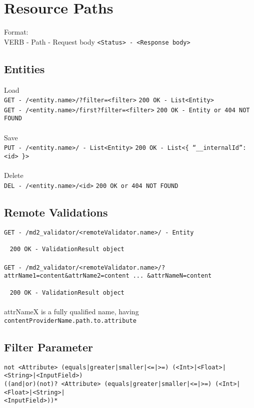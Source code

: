 
\section{Resource Paths}
Format: \\
VERB - Path - Request body \hfill \lstinline|<Status> - <Response body>|

\subsection*{Entities}

Load\\
\lstinline|GET - /<entity.name>/?filter=<filter>| \hfill \lstinline|200 OK - List<Entity>| \\
\lstinline|GET - /<entity.name>/first?filter=<filter>| \hfill \lstinline|200 OK - Entity or 404 NOT FOUND|
\\
\\
Save\\
\lstinline|PUT - /<entity.name>/ - List<Entity>| \hfill \lstinline|200 OK - List<{ “__internalId”: <id> }>|
\\
\\
Delete\\
\lstinline|DEL - /<entity.name>/<id>| \hfill \lstinline|200 OK or 404 NOT FOUND|


\subsection*{Remote Validations}
\lstinline|GET - /md2_validator/<remoteValidator.name>/ - Entity| 

~ \hfill \lstinline|200 OK - ValidationResult object|
\\ \\
\lstinline|GET - /md2_validator/<remoteValidator.name>/?attrName1=content&attrName2=content ... &attrNameN=content| 

~ \hfill \lstinline|200 OK - ValidationResult object|
\\
\\
attrNameX is a fully qualified name, having \\
\lstinline|contentProviderName.path.to.attribute|


\subsection*{Filter Parameter}
\lstinline!not <Attribute> (equals|greater|smaller|<=|>=) (<Int>|<Float>|<String>|<InputField>) !\\
\lstinline!((and|or)(not)? <Attribute> (equals|greater|smaller|<=|>=) (<Int>|<Float>|<String>|!\\
\lstinline!<InputField>))*!

